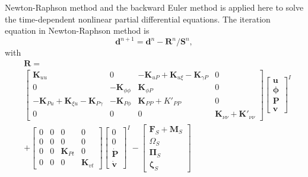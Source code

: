 Newton-Raphson method and the backward Euler method is applied here to solve the time-dependent nonlinear partial differential equations. The iteration equation in Newton-Raphson method is 
\begin{equation}
     \mathbf{d}^{n+1}=\mathbf{d}^n-\mathbf{R}^n/\mathbf{S}^n,
\end{equation}
with 
\begin{equation}
    \begin{split}
        &\mathbf{R}= \\
        &\begin{bmatrix}
            \mathbf{K}_{uu} & 0 & -\mathbf{K}_{uP}+\mathbf{K}_{u\xi}-\mathbf{K}_{\gamma P} & 0 \\
            0 & -\mathbf{K}_{\phi\phi} & \mathbf{K}_{\phi P} & 0 \\
            -\mathbf{K}_{Pu}+\mathbf{K}_{\xi u}-\mathbf{K}_{P \gamma} & -\mathbf{K}_{P\phi } & \mathbf{K}_{PP}+K'_{PP} & 0 \\
            0 & 0 & 0 & \mathbf{K}_{\nu\nu}+\mathbf{K}'_{\nu\nu}
        \end{bmatrix}
        \begin{bmatrix}
            \mathbf{u}\\ \mathbf{\phi} \\ \mathbf{P} \\ \mathbf{v}
        \end{bmatrix}^I \\
        &+ 
        \begin{bmatrix}
            0 & 0 & 0 & 0 \\
            0 & 0 & 0 & 0 \\
            0 & 0 & \mathbf{K}_{Pt} & 0 \\
            0 & 0 & 0 & \mathbf{K}_{vt} 
        \end{bmatrix}
        \begin{bmatrix}
            0\\ 0 \\ \dot{\mathbf{P}} \\ \dot{\mathbf{v}}
        \end{bmatrix}^I
        -
        \begin{bmatrix}
            \mathbf{F}_S+\mathbf{M}_S \\
            {\Omega}_S \\
            \mathbf{\Pi}_S \\
            \mathbf{\zeta}_S
        \end{bmatrix}
    \end{split}
\end{equation}
